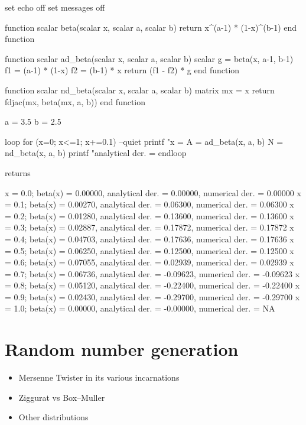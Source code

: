 \begin{code}
set echo off
set messages off

function scalar beta(scalar x, scalar a, scalar b)
    return x^(a-1) * (1-x)^(b-1)
end function

function scalar ad_beta(scalar x, scalar a, scalar b)
    scalar g = beta(x, a-1, b-1)
    f1 = (a-1) * (1-x)
    f2 = (b-1) * x
    return (f1 - f2) * g
end function

function scalar nd_beta(scalar x, scalar a, scalar b)
    matrix mx = {x}
    return fdjac(mx, beta(mx, a, b))
end function

a = 3.5
b = 2.5

loop for (x=0; x<=1; x+=0.1) --quiet
    printf "x = %
    A = ad_beta(x, a, b)
    N = nd_beta(x, a, b)
    printf "analytical der. = %
endloop
\end{code}

returns 

\begin{code}
x = 0.0; beta(x) = 0.00000, analytical der. =  0.00000, numerical der. =  0.00000
x = 0.1; beta(x) = 0.00270, analytical der. =  0.06300, numerical der. =  0.06300
x = 0.2; beta(x) = 0.01280, analytical der. =  0.13600, numerical der. =  0.13600
x = 0.3; beta(x) = 0.02887, analytical der. =  0.17872, numerical der. =  0.17872
x = 0.4; beta(x) = 0.04703, analytical der. =  0.17636, numerical der. =  0.17636
x = 0.5; beta(x) = 0.06250, analytical der. =  0.12500, numerical der. =  0.12500
x = 0.6; beta(x) = 0.07055, analytical der. =  0.02939, numerical der. =  0.02939
x = 0.7; beta(x) = 0.06736, analytical der. = -0.09623, numerical der. = -0.09623
x = 0.8; beta(x) = 0.05120, analytical der. = -0.22400, numerical der. = -0.22400
x = 0.9; beta(x) = 0.02430, analytical der. = -0.29700, numerical der. = -0.29700
x = 1.0; beta(x) = 0.00000, analytical der. = -0.00000, numerical der. =       NA
\end{code}

\clearpage

\section{Random number generation}

\begin{itemize}
\item Mersenne Twister in its various incarnations
\item Ziggurat vs Box--Muller
\item Other distributions
\end{itemize}

